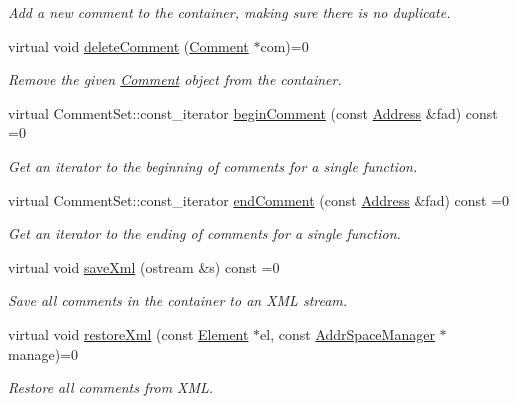 \begin{DoxyCompactItemize}
\begin{DoxyCompactList}\small\item\em Add a new comment to the container, making sure there is no duplicate. \end{DoxyCompactList}\item 
virtual void \mbox{\hyperlink{class_comment_database_ac41202723e47b57dd4996d484629d019}{delete\+Comment}} (\mbox{\hyperlink{class_comment}{Comment}} $\ast$com)=0
\begin{DoxyCompactList}\small\item\em Remove the given \mbox{\hyperlink{class_comment}{Comment}} object from the container. \end{DoxyCompactList}\item 
virtual Comment\+Set\+::const\+\_\+iterator \mbox{\hyperlink{class_comment_database_a4eb1eb37180fc092244b37ea11f7f2a4}{begin\+Comment}} (const \mbox{\hyperlink{class_address}{Address}} \&fad) const =0
\begin{DoxyCompactList}\small\item\em Get an iterator to the beginning of comments for a single function. \end{DoxyCompactList}\item 
virtual Comment\+Set\+::const\+\_\+iterator \mbox{\hyperlink{class_comment_database_a51e0634dc24c921507426298910336f4}{end\+Comment}} (const \mbox{\hyperlink{class_address}{Address}} \&fad) const =0
\begin{DoxyCompactList}\small\item\em Get an iterator to the ending of comments for a single function. \end{DoxyCompactList}\item 
virtual void \mbox{\hyperlink{class_comment_database_ab80e2cbdabe2e275695c5980b8f8eb9a}{save\+Xml}} (ostream \&s) const =0
\begin{DoxyCompactList}\small\item\em Save all comments in the container to an X\+ML stream. \end{DoxyCompactList}\item 
virtual void \mbox{\hyperlink{class_comment_database_a21e8b98e7f4276e239f6b2ea59191ded}{restore\+Xml}} (const \mbox{\hyperlink{class_element}{Element}} $\ast$el, const \mbox{\hyperlink{class_addr_space_manager}{Addr\+Space\+Manager}} $\ast$manage)=0
\begin{DoxyCompactList}\small\item\em Restore all comments from X\+ML. \end{DoxyCompactList}\end{DoxyCompactItemize}


